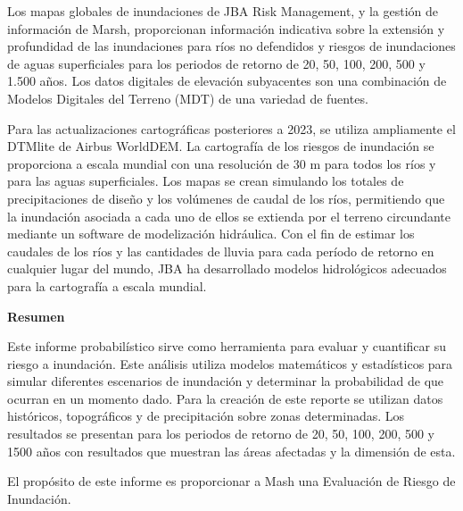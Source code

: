 \documentclass[
]{article}
\begin{document}
\fontsize{11}{13}\selectfont Los mapas globales de inundaciones de JBA
Risk Management, y la gestión de información de Marsh, proporcionan
información indicativa sobre la extensión y profundidad de las
inundaciones para ríos no defendidos y riesgos de inundaciones de aguas
superficiales para los periodos de retorno de 20, 50, 100, 200, 500 y
1.500 años. Los datos digitales de elevación subyacentes son una
combinación de Modelos Digitales del Terreno (MDT) de una variedad de
fuentes.

\fontsize{11}{13}\selectfont Para las actualizaciones cartográficas
posteriores a 2023, se utiliza ampliamente el DTMlite de Airbus
WorldDEM. La cartografía de los riesgos de inundación se proporciona a
escala mundial con una resolución de 30 m para todos los ríos y para las
aguas superficiales. Los mapas se crean simulando los totales de
precipitaciones de diseño y los volúmenes de caudal de los ríos,
permitiendo que la inundación asociada a cada uno de ellos se extienda
por el terreno circundante mediante un software de modelización
hidráulica. Con el fin de estimar los caudales de los ríos y las
cantidades de lluvia para cada período de retorno en cualquier lugar del
mundo, JBA ha desarrollado modelos hidrológicos adecuados para la
cartografía a escala mundial.

\newpage

\noindent \textbf{\textcolor{azuloscuro}{\fontsize{28}{32}\selectfont Resumen}}
\label{sec:summary} \vspace{0.5cm}

\fontsize{11}{13}\selectfont Este informe probabilístico sirve como
herramienta para evaluar y cuantificar su riesgo a inundación. Este
análisis utiliza modelos matemáticos y estadísticos para simular
diferentes escenarios de inundación y determinar la probabilidad de que
ocurran en un momento dado. Para la creación de este reporte se utilizan
datos históricos, topográficos y de precipitación sobre zonas
determinadas. Los resultados se presentan para los periodos de retorno
de 20, 50, 100, 200, 500 y 1500 años con resultados que muestran las
áreas afectadas y la dimensión de esta.

\fontsize{11}{13}\selectfont El propósito de este informe es
proporcionar a Mash una Evaluación de Riesgo de Inundación.
\end{document}
